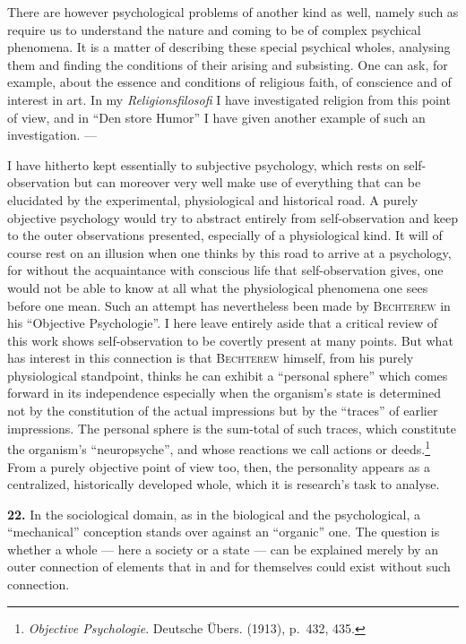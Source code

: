 \documentclass[12pt]{book}
\newcommand{\hnum}[1]{\textbf{#1.}\enspace}
\newcommand{\opage}[1]{\marginnote{\footnotesize\textit{[#1]}}}
\begin{document}
\opage{59}There are however psychological problems of another kind as well, namely such as
require us to understand the nature and coming to be of complex psychical phenomena. It
is a matter of describing these special psychical wholes, analysing them and finding
the conditions of their arising and subsisting. One can ask, for example, about the
essence and conditions of religious faith, of conscience and of interest in art. In my
\textit{Religionsfilosofi} I have investigated religion from this point of view, and in
``Den store Humor'' I have given another example of such an investigation. ---

I have hitherto kept essentially to subjective psychology, which rests on
self-observation but can moreover very well make use of everything that can be
elucidated by the experimental, physiological and historical road. A purely objective
psychology would try to abstract entirely from self-observation and keep to the outer
observations presented, especially of a physiological kind. It will of course rest on
an illusion when one thinks by this road to arrive at a psychology, for without the
acquaintance with conscious life that self-observation gives, one would not be able to
know at all what the physiological phenomena one sees before one mean. Such an attempt
has nevertheless been made by \textsc{Bechterew} in his ``Objective Psychologie''. I
here leave entirely aside that a critical review of this work shows self-observation to
be covertly present at many points. But what has interest in this connection is that
\textsc{Bechterew} himself, from his purely physiological standpoint, thinks he can
exhibit a ``personal sphere'' which comes forward in its independence especially when
the organism's state is determined not by the constitution of the actual impressions
but by the ``traces'' of earlier impressions. The personal sphere is the sum-total of
such traces, which constitute the organism's ``neuropsyche'', and whose reactions we
call actions or deeds.\footnote{\textit{Objective Psychologie}. Deutsche Übers.
(1913), p.\ 432, 435.} From a purely objective point of view too, then, the
personality appears as a centralized, historically developed whole, which it is
research's task to analyse.

\hnum{22} In the sociological domain, as in the biological and the psychological, a
``mechanical'' conception stands over against an ``organic'' one. The question is
whether a whole --- here a society or a state --- can be explained merely by an outer
connection of elements that in and for themselves could exist without such connection.
\end{document}
